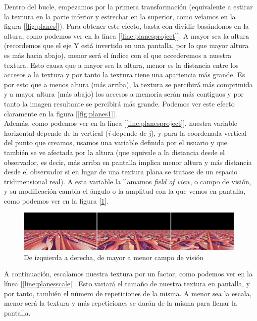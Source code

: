 Dentro del bucle, empezamos por la primera transformación (equivalente a estirar la textura en la parte inferior y estrechar en la superior, como veíamos en la figura [\ref{fig:planes}]). Para obtener este efecto, basta con dividir basándonos en la altura, como podemos ver en la línea [\ref{line:planesproject}]. A mayor sea la altura (recordemos que el eje Y está invertido en una pantalla, por lo que mayor altura es más hacia abajo), menor será el índice con el que accederemos a nuestra textura. Esto causa que a mayor sea la altura, menor es la distancia entre los accesos a la textura y por tanto la textura tiene una apariencia más grande. Es por esto que a menos altura (más arriba), la textura se percibirá más comprimida y a mayor altura (más abajo) los accesos a memoria serán más contiguos y por tanto la imagen resultante se percibirá más grande. Podemos ver este efecto claramente en la figura [\ref{fig:planes1}].\\

Además, como podemos ver en la línea [\ref{line:planesproject}], nuestra variable horizontal depende de la vertical (\emph{i} depende de \emph{j}), y para la coordenada vertical del punto que creamos, usamos una variable definida por el usuario y que también se ve afectada por la altura (que equivale a la distancia desde el observador, es decir, más arriba en pantalla implica menor altura y más distancia desde el observador si en lugar de una textura plana se tratase de un espacio tridimensional real). A esta variable la llamamos \emph{field of view}, o campo de visión, y su modificación cambia el ángulo o la amplitud con la que vemos en pantalla, como podemos ver en la figura [\ref{fig:planes2}].

\begin{figure}[h]
	\centering
	\includegraphics[width=14cm]{archivos/planes2}
	\caption{De izquierda a derecha, de mayor a menor campo de visión}
	\label{fig:planes2}
\end{figure}

A continuación, escalamos nuestra textura por un factor, como podemos ver en la línea [\ref{line:planesscale}]. Esto variará el tamaño de nuestra textura en pantalla, y por tanto, también el número de repeticiones de la misma. A menor sea la escala, menor será la textura y más repeticiones se darán de la misma para llenar la pantalla.\\

